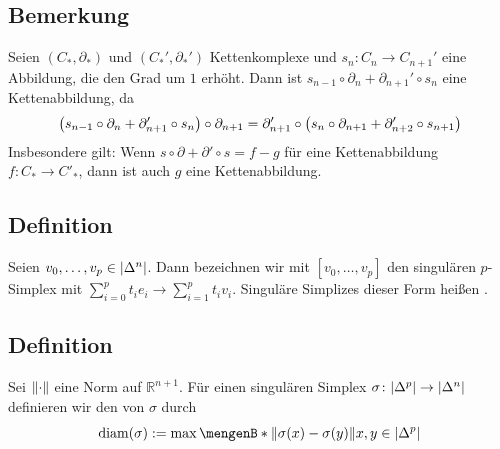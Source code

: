 \subsection[Bemerkung über Abbildungen $s_n \colon C_n \to C_{n+1}'$, die den Rang erhöhen]{Bemerkung} %
\label{sub:1313}
Seien $(C_*,\partial_*)$ und $(C_*',\partial_*')$ Kettenkomplexe und $s_n \colon C_n \to C_{n+1}'$ eine Abbildung, die den Grad um $1$ erhöht. Dann ist 
$s_{n-1} \circ \partial_n + \partial_{n+1}' \circ s_n$ eine Kettenabbildung, da
\[
	\enbrace*{s_{n-1} \circ \partial_n + \partial_{n+1}' \circ s_n} \circ \partial_{n+1} = \partial_{n+1}' \circ  \enbrace*{s_n \circ \partial_{n+1} 
	+ \partial_{n+2}' \circ s_{n+1}}  
\]
Insbesondere gilt: Wenn $s \circ \partial + \partial' \circ s = f -g$ für eine Kettenabbildung $f \colon C_* \to C'_*$, dann ist auch $g$ eine Kettenabbildung. 

\subsection[Definition: Affiner singulärer Simplex]{Definition} %
\label{sub:1314}
Seien $v_0, \ldots ,v_p \in \abs*{\Delta^n}$. Dann bezeichnen wir mit $[v_0,\ldots ,v_p]$ den singulären $p$-Simplex mit $\sum_{i=0}^{p} t_i e_i \to \sum_{i=1}^{p} t_i v_i$.
Singuläre Simplizes dieser Form heißen . 

\subsection[Definition: Durchmesser eines singulären Simplizes $\abs*{\Delta^p} \to \abs*{\Delta^n}$]{Definition} %
\label{sub:1315}
Sei $\norm{\cdot}$ eine Norm auf $\mathds{R}^{n+1}$. Für einen singulären Simplex $\sigma \colon \abs*{\Delta^p} \to \abs*{\Delta^n}$ definieren wir den 
von $\sigma$ durch
\[
	\diam(\sigma) := \max \set[\norm{\sigma(x)- \sigma(y)} ]{x,y \in \abs*{\Delta^p}\rule{0cm}{0.9em}} 
\]

